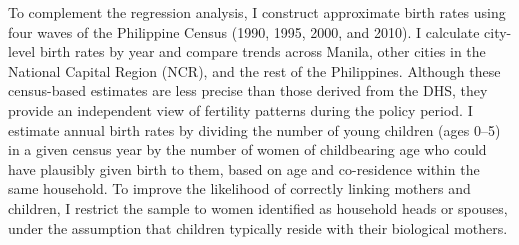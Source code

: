 \documentclass[]{AEA}
\begin{document}
\begin{table}[!h]
\centering\centering
\caption{\label{tab:first-stage-sibship-manila-qc}Difference-in-Differences: Manila vs. Quezon City, Post-2000}
\centering
{}
\end{table}

To complement the regression analysis, I construct approximate birth
rates using four waves of the Philippine Census (1990, 1995, 2000, and
2010). I calculate city-level birth rates by year and compare trends
across Manila, other cities in the National Capital Region (NCR), and
the rest of the Philippines. Although these census-based estimates are
less precise than those derived from the DHS, they provide an
independent view of fertility patterns during the policy period. I
estimate annual birth rates by dividing the number of young children
(ages 0--5) in a given census year by the number of women of
childbearing age who could have plausibly given birth to them, based on
age and co-residence within the same household. To improve the
likelihood of correctly linking mothers and children, I restrict the
sample to women identified as household heads or spouses, under the
assumption that children typically reside with their biological mothers.
\end{document}
